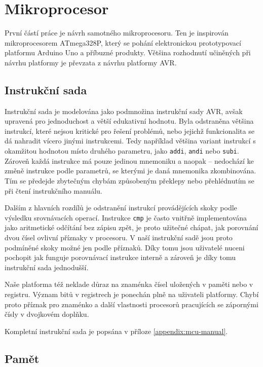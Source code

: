 \chapter{Mikroprocesor}

První částí práce je návrh samotného mikroprocesoru. Ten je inspirován mikroprocesorem ATmega328P, který se pohání elektronickou prototypovací platformu Arduino Uno a příbuzné produkty. Většina rozhodnutí učiněných při návrhu platformy je převzata z návrhu platformy AVR.

\section{Instrukční sada}

Instrukční sada je modelována jako podmnožina instrukční sady AVR, avšak upravená pro jednoduchost a větší edukativní hodnotu. Byla odstraněna většina instrukcí, které nejsou kritické pro řešení problémů, nebo jejichž funkcionalita se dá nahradit vícero jinými instrukcemi. Tedy například většina variant instrukcí s okamžitou hodnotou místo druhého parametru, jako \texttt{addi}, \texttt{andi} nebo \texttt{subi}. Zároveň každá instrukce má pouze jedinou mnemoniku a naopak -- nedochází ke změně instrukce podle parametrů, se kterými je daná mnemonika zkombinována. Tím se předejde zbytečným chybám způsobeným překlepy nebo přehlédnutím se při čtení instrukčního manuálu.

Dalším z hlavních rozdílů je odstranění instrukcí provádějících skoky podle výsledku srovnávacích operací. Instrukce \texttt{cmp} je často vnitřně implementována jako aritmetické odčítání bez zápisu zpět, je proto užitečné chápat, jak porovnání dvou čísel ovlivní příznaky v procesoru. V naší instrukční sadě jsou proto podmíněné skoky možné jen podle příznaků. Díky tomu jsou uživatelé nuceni pochopit jak funguje porovnávací instrukce interně a zároveň je díky tomu instrukční sada jednodušší.

Naše platforma též neklade důraz na znaménka čísel uložených v paměti nebo v registru. Význam bitů v registrech je ponechán plně na uživateli platformy. Chybí proto příznak pro znaménko a další vlastnosti procesorů pracujících se zápornými čísly v dvojkovém doplňku.

Kompletní instrukční sada je popsána v příloze \ref{appendix:mcu-manual}.

\section{Pamět}

